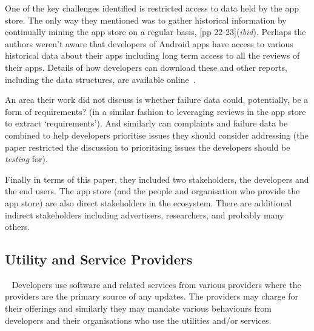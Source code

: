 One of the key challenges identified is restricted access to data held by the app store. The only way they mentioned was to gather historical information by continually mining the app store on a regular basis, [pp 22-23](\textit{ibid}). Perhaps the authors weren't aware that developers of Android apps have access to various historical data about their apps including long term access to all the reviews of their apps. Details of how developers can download these and other reports, including the data structures, are available online~.

An area their work did not discuss is whether failure data could, potentially, be a form of requirements? (in a similar fashion to leveraging reviews in the app store to extract `requirements'). And similarly can complaints and failure data be combined to help developers prioritise issues they should consider addressing (the paper restricted the discussion to prioritising issues the developers should be \textit{testing} for).

Finally in terms of this paper, they included two stakeholders, the developers and the end users. The app store (and the people and organisation who provide the app store) are also direct stakeholders in the ecosystem. There are additional indirect stakeholders including advertisers, researchers, and probably many others. 
%

\subsection{Utility and Service Providers}~\label{rw-utility-and-service-providers-topic}
Developers use software and related services from various providers where the providers are the primary source of any updates. The providers may charge for their offerings and similarly they may mandate various behaviours from developers and their organisations who use the utilities and/or services.


